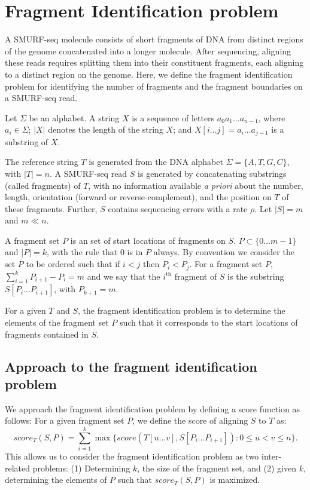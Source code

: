 \section{Fragment Identification problem}
A SMURF-seq molecule consists of short fragments of DNA from distinct
regions of the genome concatenated into a longer molecule. After
sequencing, aligning these reads requires splitting them into their
constituent fragments, each aligning to a distinct region on the genome.
Here, we define the fragment identification problem for identifying the
number of fragments and the fragment boundaries on a SMURF-seq read.

Let $\Sigma$ be an alphabet. A string $X$ is a sequence of letters $a_0
a_1 \dots a_{n-1}$, where $a_i \in \Sigma$; $|X|$ denotes the length of
the string $X$; and $X[i \dots j] = a_i \dots a_{j-1}$ is a substring of
$X$.

The reference string $T$ is generated from the DNA alphabet $\Sigma =
\{A, T, G, C\}$, with $|T| = n$.
A SMURF-seq read $S$ is generated by concatenating substrings (called
fragments) of $T$, with no information available \emph{a priori} about
the number, length, orientation (forward or reverse-complement), and the
position on $T$ of these fragments.  Further, $S$ contains sequencing
errors with a rate $\rho$. Let $|S| = m$ and $m \ll n$.

A fragment set $P$ is an set of start locations of fragments on $S$. $P
\subset \{0 \dots m-1\}$ and $|P| = k$, with the rule that $0$ is in $P$
always.
By convention we consider the set $P$ to be ordered such that if $i < j$
then $P_i < P_j$.
For a fragment set $P$, $\sum_{i = 1}^{k} P_{i+1} - P_i = m$ and we say
that the $i^{\text{th}}$ fragment of $S$ is the substring $S[P_i \dots
P_{i+1}]$, with $P_{k+1} = m$.

For a given $T$ and $S$, the fragment identification problem is to
determine the elements of the fragment set $P$ such that it corresponds
to the start locations of fragments contained in $S$.



\subsection{Approach to the fragment identification problem}
We approach the fragment identification problem by defining a score
function as follows:
For a given fragment set $P$, we define the score of aligning $S$ to $T$
as: \[score_T(S,P) = \sum_{i=1}^{k} \max\{score(T[u \dots v], S[P_i
\dots P_{i+1}]): 0 \leq u < v \leq n\}.\]
%
This allows us to consider the fragment identification problem as two
inter-related problems: (1) Determining $k$, the size of the fragment
set, and (2) given $k$, determining the elements of $P$ such that
$score_T(S, P)$ is maximized.

